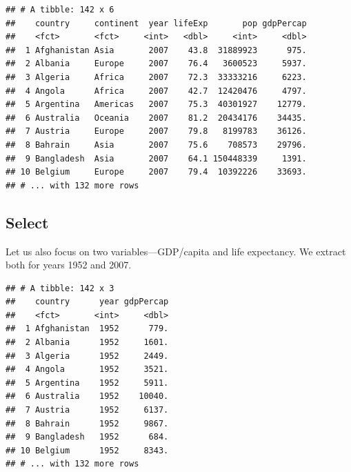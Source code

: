 \documentclass[11pt,]{article}
\newenvironment{Shaded}{\begin{snugshade}}{\end{snugshade}}
\newcommand{\KeywordTok}[1]{\textcolor[rgb]{0.13,0.29,0.53}{\textbf{#1}}}
\newcommand{\DecValTok}[1]{\textcolor[rgb]{0.00,0.00,0.81}{#1}}
\newcommand{\StringTok}[1]{\textcolor[rgb]{0.31,0.60,0.02}{#1}}
\newcommand{\OperatorTok}[1]{\textcolor[rgb]{0.81,0.36,0.00}{\textbf{#1}}}
\newcommand{\NormalTok}[1]{#1}
\begin{document}
\begin{verbatim}
## # A tibble: 142 x 6
##    country     continent  year lifeExp       pop gdpPercap
##    <fct>       <fct>     <int>   <dbl>     <int>     <dbl>
##  1 Afghanistan Asia       2007    43.8  31889923      975.
##  2 Albania     Europe     2007    76.4   3600523     5937.
##  3 Algeria     Africa     2007    72.3  33333216     6223.
##  4 Angola      Africa     2007    42.7  12420476     4797.
##  5 Argentina   Americas   2007    75.3  40301927    12779.
##  6 Australia   Oceania    2007    81.2  20434176    34435.
##  7 Austria     Europe     2007    79.8   8199783    36126.
##  8 Bahrain     Asia       2007    75.6    708573    29796.
##  9 Bangladesh  Asia       2007    64.1 150448339     1391.
## 10 Belgium     Europe     2007    79.4  10392226    33693.
## # ... with 132 more rows
\end{verbatim}

\subsection{Select}\label{select}

Let us also focus on two variables---GDP/capita and life expectancy. We
extract both for years 1952 and 2007.

\begin{Shaded}
\end{Shaded}

\begin{verbatim}
## # A tibble: 142 x 3
##    country      year gdpPercap
##    <fct>       <int>     <dbl>
##  1 Afghanistan  1952      779.
##  2 Albania      1952     1601.
##  3 Algeria      1952     2449.
##  4 Angola       1952     3521.
##  5 Argentina    1952     5911.
##  6 Australia    1952    10040.
##  7 Austria      1952     6137.
##  8 Bahrain      1952     9867.
##  9 Bangladesh   1952      684.
## 10 Belgium      1952     8343.
## # ... with 132 more rows
\end{verbatim}

\begin{Shaded}
\end{Shaded}
\end{document}
